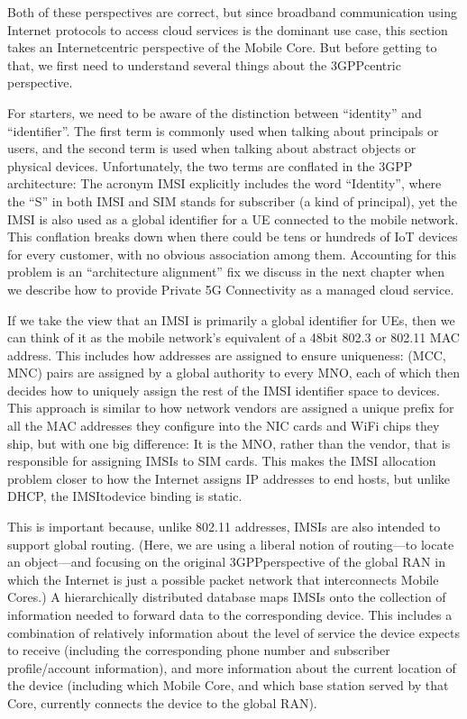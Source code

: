 \documentclass[a4paper,11pt,english]{sphinxmanual}
\begin{document}
\sphinxAtStartPar
Both of these perspectives are correct, but since broadband
communication using Internet protocols to access cloud services is
the dominant use case, this section takes an Internet\sphinxhyphen{}centric
perspective of the Mobile Core. But before getting to that, we first
need to understand several things about the 3GPP\sphinxhyphen{}centric perspective.

\sphinxAtStartPar
For starters, we need to be aware of the distinction between
“identity” and “identifier”. The first term is commonly used when
talking about principals or users, and the second term is used when
talking about abstract objects or physical devices. Unfortunately, the
two terms are conflated in the 3GPP architecture: The acronym IMSI
explicitly includes the word “Identity”, where the “S” in both IMSI
and SIM stands for subscriber (a kind of principal), yet the IMSI is
also used as a global identifier for a UE connected to the mobile
network. This conflation breaks down when there could be tens or
hundreds of IoT devices for every customer, with no obvious association
among them. Accounting for this problem is an “architecture alignment”
fix we discuss in the next chapter when we describe how to provide
Private 5G Connectivity as a managed cloud service.

\sphinxAtStartPar
If we take the view that an IMSI is primarily a global identifier for
UEs, then we can think of it as the mobile network’s equivalent of a
48\sphinxhyphen{}bit 802.3 or 802.11 MAC address. This includes how addresses are
assigned to ensure uniqueness: (MCC, MNC) pairs are assigned by a
global authority to every MNO, each of which then decides how to
uniquely assign the rest of the IMSI identifier space to devices. This
approach is similar to how network vendors are assigned a unique
prefix for all the MAC addresses they configure into the NIC cards and
WiFi chips they ship, but with one big difference: It is the MNO,
rather than the vendor, that is responsible for assigning IMSIs to SIM
cards. This makes the IMSI allocation problem closer to how the
Internet assigns IP addresses to end hosts, but unlike DHCP, the
IMSI\sphinxhyphen{}to\sphinxhyphen{}device binding is static.

\sphinxAtStartPar
This is important because, unlike 802.11 addresses, IMSIs are also
intended to support global routing. (Here, we are using a liberal
notion of routing—to locate an object—and focusing on the original
3GPP\sphinxhyphen{}perspective of the global RAN in which the Internet is just a
possible packet network that interconnects Mobile Cores.) A
hierarchically distributed database maps IMSIs onto the collection of
information needed to forward data to the corresponding device. This
includes a combination of relatively  information about the
level of service the device expects to receive (including the
corresponding phone number and subscriber profile/account
information), and more  information about the current
location of the device (including which Mobile Core, and which base
station served by that Core, currently connects the device to the
global RAN).
\end{document}
